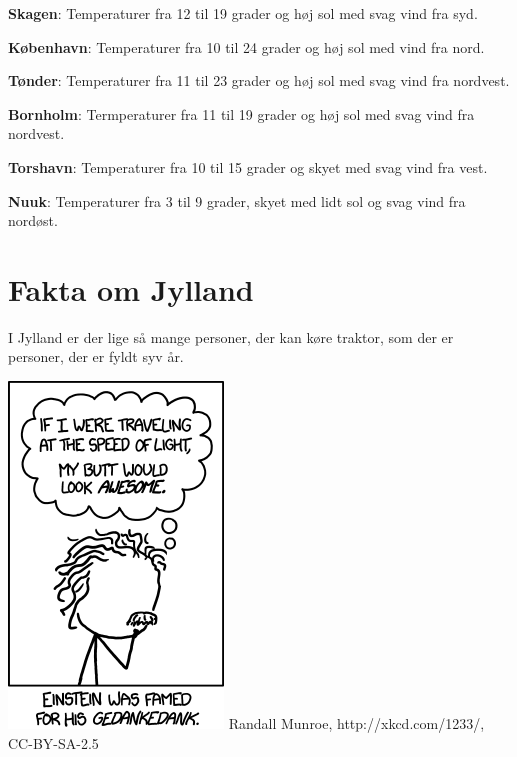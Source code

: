 \begin{minipage}[b]{0.95\linewidth}
\begin{minipage}[t]{0.47\textwidth}
\textbf{Skagen}: Temperaturer fra 12 til 19 grader og høj sol med svag vind fra syd.

\textbf{København}: Temperaturer fra 10 til 24 grader og høj sol med vind fra nord.

\textbf{Tønder}: Temperaturer fra 11 til 23 grader og høj sol med svag vind fra nordvest.

\textbf{Bornholm}: Termperaturer fra 11 til 19 grader og høj sol med svag vind fra nordvest.

\textbf{Torshavn}: Temperaturer fra 10 til 15 grader og skyet med svag vind fra vest.

\textbf{Nuuk}: Temperaturer fra 3 til 9 grader, skyet med lidt sol og svag vind fra nordøst.

\section*{Fakta om Jylland}
I Jylland er der lige så mange personer, der kan køre traktor, som der er personer, der er fyldt syv år.

\vspace{1mm}
\includegraphics[width=\linewidth]{relativity.png}
\tiny Randall Munroe, http://xkcd.com/1233/, CC-BY-SA-2.5


\end{minipage}
\end{minipage}
